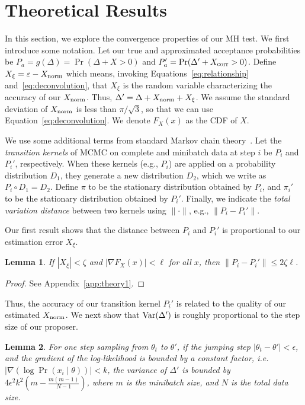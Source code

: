 \documentclass{article}
\newtheorem{lemma}{Lemma}
\begin{document}
\section{Theoretical Results}\label{sec:theory}

In this section, we explore the convergence properties of our MH test. We first introduce some
notation. Let our true and approximated acceptance probabilities be $P_a = g(\Delta) = \Pr(\Delta +
X > 0)$ and $P_a' = \Pr(\Delta' + X_{\rm corr} > 0)$.  Define $X_{\xi} = \varepsilon - X_{\rm norm}$
which means, invoking Equations~\ref{eq:relationship} and~\ref{eq:deconvolution}, that $X_\xi$ is
the random variable characterizing the accuracy of our $X_{\rm norm}$.  Thus, $\Delta' = \Delta +
X_{\rm norm} + X_\xi$. We assume the standard deviation of $X_{\rm norm}$ is less than
$\pi/\sqrt{3}$, so that we can use Equation~\ref{eq:deconvolution}. We denote $F_X(x)$ as the CDF of
$X$.

We use some additional terms from standard Markov chain theory~\cite{Meyn2009}. Let the
\emph{transition kernels} of MCMC on complete and minibatch data at step $i$ be $P_i$ and $P_i'$,
respectively. When these kernels (e.g., $P_i$) are applied on a probability distribution $D_1$, they
generate a new distribution $D_2$, which we write as $P_i \circ D_1 = D_2$. Define $\pi$ to be the
stationary distribution obtained by $P_i$, and $\pi_i'$ to be the stationary distribution obtained by $P_i'$.  Finally, we indicate the \emph{total variation distance}
between two kernels using $\| \cdot \|$, e.g., $\|P_i-P_i'\|$.

Our first result shows that the distance between $P_i$ and $P_i'$ is proportional to our estimation
error $X_{\xi}$.

\begin{lemma}\label{lem:theory1}
If $|X_\xi| < \zeta$ and $|\nabla F_X(x)| < \ell$ for all $x$, then $\|P_i-P_i'\| \le 2\zeta \ell$.
\end{lemma}

\begin{proof}
See Appendix~\ref{app:theory1}.
\end{proof}

Thus, the accuracy of our transition kernel $P_i'$ is related to the quality of our estimated
$X_{\rm norm}$. We next show that ${\rm Var}(\Delta')$ is roughly proportional to the step size of
our proposer.

\begin{lemma}\label{lem:theory2}
For one step sampling from $\theta_t$ to $\theta'$, if the jumping step $|\theta_t - \theta'| <
\epsilon$, and the gradient of the log-likelihood is bounded by a constant factor, i.e. $|\nabla
(\log \Pr(x_i\mid \theta))| < k$, the variance of $\Delta'$ is bounded by $4\epsilon^2 k^2 (m-\frac{m(m-1)}{N-1})$, where
$m$ is the minibatch size, and $N$ is the total data size.
\end{lemma}
\end{document}
